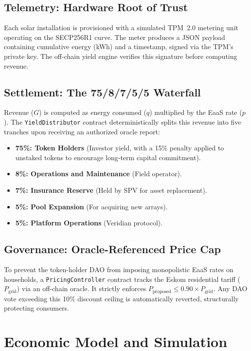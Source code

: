 \documentclass[conference]{IEEEtran}
\begin{document}
\subsection{Telemetry: Hardware Root of Trust}
Each solar installation is provisioned with a simulated TPM~2.0 metering unit operating on the SECP256R1 curve. The meter produces a JSON payload containing cumulative energy (kWh) and a timestamp, signed via the TPM's private key. The off-chain yield engine verifies this signature before computing revenue. 

\subsection{Settlement: The 75/8/7/5/5 Waterfall}
\label{sec:waterfall}
Revenue ($G$) is computed as energy consumed ($q$) multiplied by the EaaS rate ($p$). The \texttt{YieldDistributor} contract deterministically splits this revenue into five tranches upon receiving an authorized oracle report:
\begin{itemize}
    \item \textbf{75\%: Token Holders} (Investor yield, with a 15\% penalty applied to unstaked tokens to encourage long-term capital commitment).
    \item \textbf{8\%: Operations and Maintenance} (Field operator).
    \item \textbf{7\%: Insurance Reserve} (Held by SPV for asset replacement).
    \item \textbf{5\%: Pool Expansion} (For acquiring new arrays).
    \item \textbf{5\%: Platform Operations} (Veridian protocol).
\end{itemize}

\subsection{Governance: Oracle-Referenced Price Cap}
To prevent the token-holder DAO from imposing monopolistic EaaS rates on households, a \texttt{PricingController} contract tracks the Eskom residential tariff ($P_{\text{grid}}$) \cite{eskom2024tariff} via an off-chain oracle. It strictly enforces $P_{\text{proposed}} \leq 0.90 \times P_{\text{grid}}$. Any DAO vote exceeding this 10\% discount ceiling is automatically reverted, structurally protecting consumers.

\section{Economic Model and Simulation}
\label{sec:economic}
\end{document}
